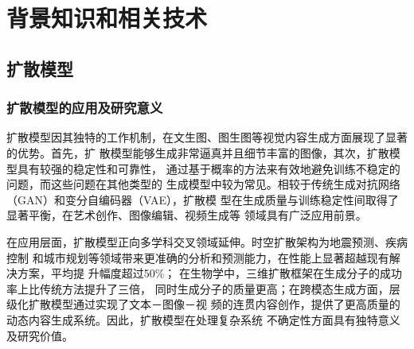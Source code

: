 \newpage


\section{背景知识和相关技术}
\subsection{扩散模型}
\subsubsection{扩散模型的应用及研究意义}
\par
扩散模型因其独特的工作机制，在文生图、图生图等视觉内容生成方面展现了显著的优势。首先，扩
散模型能够生成非常逼真并且细节丰富的图像，其次，扩散模型具有较强的稳定性和可靠性，
通过基于概率的方法来有效地避免训练不稳定的问题，而这些问题在其他类型的
生成模型中较为常见\cite{ho2020denoising, rombach2022high}。相较于传统生成对抗网络（GAN）和变分自编码器（VAE），扩散模
型在生成质量与训练稳定性间取得了显著平衡\cite{sohl2015deep, dhariwal2021diffusion}，在艺术创作、图像编辑、视频生成等
领域具有广泛应用前景。
\par
在应用层面，扩散模型正向多学科交叉领域延伸。时空扩散架构为地震预测、疾病控制
和城市规划等领域带来更准确的分析和预测能力，在性能上显著超越现有解决方案，平均提
升幅度超过50\%\cite{ruhling2023dyffusion, yuan2023spatio}；
在生物学中，三维扩散框架在生成分子的成功率上比传统方法提升了三倍\cite{peng2023moldiff}，
同时生成分子的质量更高；在跨模态生成方面，层级化扩散模型通过实现了文本－图像－视
频的连贯内容创作\cite{yang2024cross}，提供了更高质量的动态内容生成系统。因此，扩散模型在处理复杂系统
不确定性方面具有独特意义及研究价值。
